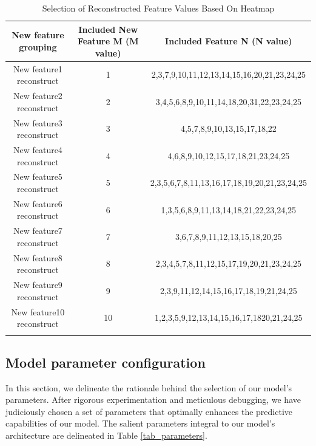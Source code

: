 \documentclass[sn-mathphys,Numbered]{sn-jnl}
\theoremstyle{thmstyleone}%
\theoremstyle{thmstyletwo}%
\theoremstyle{thmstylethree}%
\begin{document}
\begin{table}[h]
\caption{Selection of Reconstructed Feature Values Based On Heatmap}\label{tab_5}%
\begin{tabular}{@{}ccc@{}}
\toprule
New feature grouping & 
Included New Feature M (M value) & 
Included Feature N (N value)  \\
\midrule
New feature1 reconstruct  & 1  & 2,3,7,9,10,11,12,13,14,15,16,20,21,23,24,25 \\
New feature2 reconstruct  & 2  & 3,4,5,6,8,9,10,11,14,18,20,31,22,23,24,25 \\
New feature3 reconstruct  & 3  & 4,5,7,8,9,10,13,15,17,18,22 \\
New feature4 reconstruct  & 4  & 4,6,8,9,10,12,15,17,18,21,23,24,25 \\
New feature5 reconstruct  & 5  & 2,3,5,6,7,8,11,13,16,17,18,19,20,21,23,24,25 \\
New feature6 reconstruct  & 6  & 1,3,5,6,8,9,11,13,14,18,21,22,23,24,25 \\
New feature7 reconstruct  & 7  & 3,6,7,8,9,11,12,13,15,18,20,25 \\
New feature8 reconstruct  & 8  & 2,3,4,5,7,8,11,12,15,17,19,20,21,23,24,25 \\
New feature9 reconstruct  & 9  & 2,3,9,11,12,14,15,16,17,18,19,21,24,25 \\
New feature10 reconstruct & 10 & 1,2,3,5,9,12,13,14,15,16,17,1820,21,24,25 \\
\botrule
\end{tabular}
\end{table}




\subsection{Model parameter configuration}\label{subsubsec1}
In this section, we delineate the rationale behind the selection of our model's parameters. After rigorous experimentation and meticulous debugging, we have judiciously chosen a set of parameters that optimally enhances the predictive capabilities of our model. The salient parameters integral to our model's architecture are delineated in Table \ref{tab_parameters}.
\end{document}
